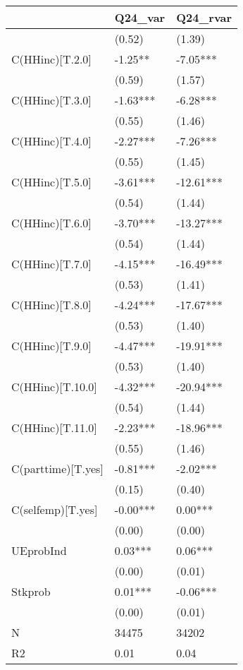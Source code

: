 \documentclass{report}
\begin{document}
\begin{table}\begin{tabular}{lll}
\toprule
{} &   Q24\_var &   Q24\_rvar \\
\midrule
                   &    (0.52) &     (1.39) \\
C(HHinc)[T.2.0]    &   -1.25** &   -7.05*** \\
                   &    (0.59) &     (1.57) \\
C(HHinc)[T.3.0]    &  -1.63*** &   -6.28*** \\
                   &    (0.55) &     (1.46) \\
C(HHinc)[T.4.0]    &  -2.27*** &   -7.26*** \\
                   &    (0.55) &     (1.45) \\
C(HHinc)[T.5.0]    &  -3.61*** &  -12.61*** \\
                   &    (0.54) &     (1.44) \\
C(HHinc)[T.6.0]    &  -3.70*** &  -13.27*** \\
                   &    (0.54) &     (1.44) \\
C(HHinc)[T.7.0]    &  -4.15*** &  -16.49*** \\
                   &    (0.53) &     (1.41) \\
C(HHinc)[T.8.0]    &  -4.24*** &  -17.67*** \\
                   &    (0.53) &     (1.40) \\
C(HHinc)[T.9.0]    &  -4.47*** &  -19.91*** \\
                   &    (0.53) &     (1.40) \\
C(HHinc)[T.10.0]   &  -4.32*** &  -20.94*** \\
                   &    (0.54) &     (1.44) \\
C(HHinc)[T.11.0]   &  -2.23*** &  -18.96*** \\
                   &    (0.55) &     (1.46) \\
C(parttime)[T.yes] &  -0.81*** &   -2.02*** \\
                   &    (0.15) &     (0.40) \\
C(selfemp)[T.yes]  &  -0.00*** &    0.00*** \\
                   &    (0.00) &     (0.00) \\
UEprobInd          &   0.03*** &    0.06*** \\
                   &    (0.00) &     (0.01) \\
Stkprob            &   0.01*** &   -0.06*** \\
                   &    (0.00) &     (0.01) \\
N                  &     34475 &      34202 \\
R2                 &      0.01 &       0.04 \\
\bottomrule
\end{tabular}
\end{table}
\end{document}
